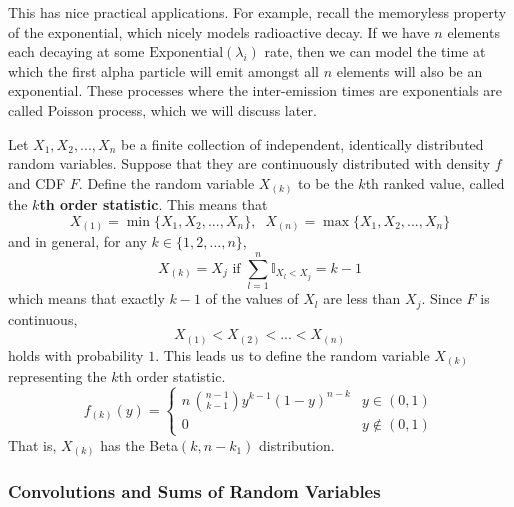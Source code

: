 \documentclass{article}
\begin{document}
      This has nice practical applications. For example, recall the memoryless property of the exponential, which nicely models radioactive decay. If we have $n$ elements each decaying at some $\mathrm{Exponential}(\lambda_i)$ rate, then we can model the time at which the first alpha particle will emit amongst all $n$ elements will also be an exponential. These processes where the inter-emission times are exponentials are called Poisson process, which we will discuss later. 

      \begin{definition}
        Let $X_1, X_2, ..., X_n$ be a finite collection of independent, identically distributed random variables. Suppose that they are continuously distributed with density $f$ and CDF $F$. Define the random variable $X_{(k)}$ to be the $k$th ranked value, called the \textbf{$k$th order statistic}. This means that 
        \begin{equation}
          X_{(1)} = \min\{X_1, X_2, ..., X_n\}, \;\; X_{(n)} = \max\{X_1, X_2, ..., X_n\}
        \end{equation}
        and in general, for any $k \in \{1, 2, ..., n\}$, 
        \begin{equation}
          X_{(k)} = X_j \text{ if } \sum_{l=1}^n \mathbb{I}_{X_l < X_j} = k - 1
        \end{equation}
        which means that exactly $k-1$ of the values of $X_l$ are less than $X_j$. Since $F$ is continuous, 
        \begin{equation}
          X_{(1)} < X_{(2)} < ... < X_{(n)}
        \end{equation}
        holds with probability $1$. This leads us to define the random variable $X_{(k)}$ representing the $k$th order statistic.
        \begin{equation}
          f_{(k)} (y) = \begin{cases} 
          n \, \binom{n-1}{k-1} y^{k-1} (1-y)^{n-k} & y \in (0, 1) \\
          0 & y \not\in (0,1)
          \end{cases}
        \end{equation}
        That is, $X_{(k)}$ has the Beta$(k, n-k_1)$ distribution. 
      \end{definition}

    \subsubsection{Convolutions and Sums of Random Variables}
\end{document}
